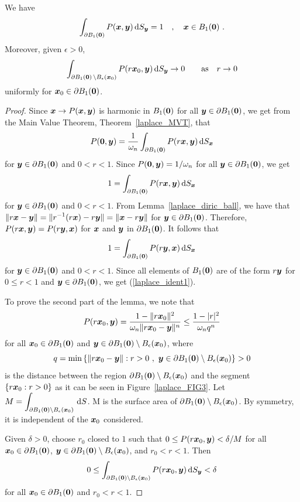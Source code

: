 {
\begin{lemma}
We have                 \label{laplaceLexistBall}
\begin{equation}   \label{laplace_ident1}
\int_{\partial B_1({\bm{0}})} P({\bm{x}},{\bm{y}}) \,\mathrm{d}{S}_{{\bm{y}}} = 1 \quad ,
\quad {\bm{x}} \in B_1({\bm{0}}) \ .
\end{equation}
Moreover, given $\epsilon >0$,
\[
\int_{\partial B_1({\bm{0}}) \,\setminus B_\epsilon({\bm{x}}_0)}
P(r{\bm{x}}_0,{\bm{y}}) \,\mathrm{d}{S}_{{\bm{y}}} \rightarrow  0 \qquad \text{as} \quad 
r\rightarrow 0
\]
uniformly for ${\bm{x}}_0 \in \partial B_1({\bm{0}})$.
\end{lemma}
}

\begin{proof}
Since ${\bm{x}} \rightarrow P({\bm{x}},{\bm{y}})$
is harmonic in $B_1({\bm{0}})$ for all ${\bm{y}}\in \partial B_1({\bm{0}})$,
we get from the Main Value Theorem, Theorem~\ref{laplace_MVT}, that 
\[
P({\bm{0}},{\bm{y}}) = \frac{1}{\omega_n} \int_{\partial B_1({\bm{0}})}
P(r{\bm{x}},{\bm{y}}) \,\mathrm{d}{S}_{{\bm{x}}}
\]
for ${\bm{y}} \in \partial B_1({\bm{0}})$ and $0<r<1$.
Since $\displaystyle P({\bm{0}},{\bm{y}}) = 1/\omega_n$ for all
${\bm{y}} \in \partial B_1({\bm{0}})$, we get
\[
1 = \int_{\partial B_1({\bm{0}})}
P(r{\bm{x}},{\bm{y}}) \,\mathrm{d}{S}_{{\bm{x}}}
\]
for ${\bm{y}} \in \partial B_1({\bm{0}})$ and $0<r<1$.
From Lemma~\ref{laplace_diric_ball}, we have that
$\displaystyle \|r{\bm{x}} - {\bm{y}}\| = \|r^{-1}(r{\bm{x}})- r {\bm{y}}\|
= \|{\bm{x}} - r {\bm{y}}\|$ for ${\bm{y}} \in \partial B_1({\bm{0}})$. 
Therefore, $\displaystyle P(r{\bm{x}},{\bm{y}}) = P(r{\bm{y}},{\bm{x}})$ for
${\bm{x}}$ and ${\bm{y}}$ in $\partial B_1({\bm{0}})$.  It follows that
\[
1 = \int_{\partial B_1({\bm{0}})}
P(r{\bm{y}},{\bm{x}}) \,\mathrm{d}{S}_{{\bm{x}}}
\]
for ${\bm{y}} \in \partial B_1({\bm{0}})$ and $0<r<1$.
Since all elements of $B_1({\bm{0}})$ are of the form $r{\bm{y}}$ for
$0\leq r <1$ and ${\bm{y}} \in \partial B_1({\bm{0}})$, we get
(\ref{laplace_ident1}).

To prove the second part of the lemma, we note that
\[
P(r{\bm{x}}_0,{\bm{y}}) =
\frac{1-\|r{\bm{x}}_0\|^2}{\omega_n\|r{\bm{x}}_0 - {\bm{y}}\|^n} \leq
\frac{1- |r|^2}{\omega_n q^n}
\]
for all $\displaystyle {\bm{x}}_0 \in \partial B_1({\bm{0}})$ and
$\displaystyle {\bm{y}} \in \partial B_1({\bm{0}})
\setminus B_\epsilon({\bm{x}}_0)$, where
\[
q = \min \left\{ \|r{\bm{x}}_0 - {\bm{y}} \| : r>0 \ , \ {\bm{y}} \in
\partial B_1({\bm{0}}) \setminus B_\epsilon({\bm{x}}_0) \right\} > 0
\]
is the distance between the region
$\partial B_1({\bm{0}}) \setminus B_\epsilon({\bm{x}}_0)$ and the segment
$\{ r{\bm{x}}_0 : r >0 \}$ as it can be seen in
Figure~\ref{laplace_FIG3}.  Let
$\displaystyle M =
\int_{\partial B_1({\bm{0}}) \setminus B_\epsilon({\bm{x}}_0)} \,\mathrm{d}{S}$.
M is the surface area of
$\partial B_1({\bm{0}}) \setminus B_\epsilon({\bm{x}}_0)$.  By symmetry,
it is independent of the ${\bm{x}}_0$ considered.

Given $\delta >0$, choose $r_0$ closed to $1$ such that
$\displaystyle 0 \leq P(r{\bm{x}}_0,{\bm{y}}) < \delta/M$
for all $\displaystyle {\bm{x}}_0 \in \partial B_1({\bm{0}})$,
$\displaystyle {\bm{y}} \in \partial B_1({\bm{0}}) \setminus
B_\epsilon({\bm{x}}_0)$, and $r_0 <r < 1$.  Then
\[
0 \leq \int_{\partial B_1({\bm{0}}) \setminus B_\epsilon({\bm{x}}_0)}
P(r{\bm{x}}_0,{\bm{y}}) \,\mathrm{d}{S}_{{\bm{y}}} < \delta
\]
for all ${\bm{x}}_0 \in \partial B_1({\bm{0}})$ and $r_0 <r < 1$.
\end{proof}

